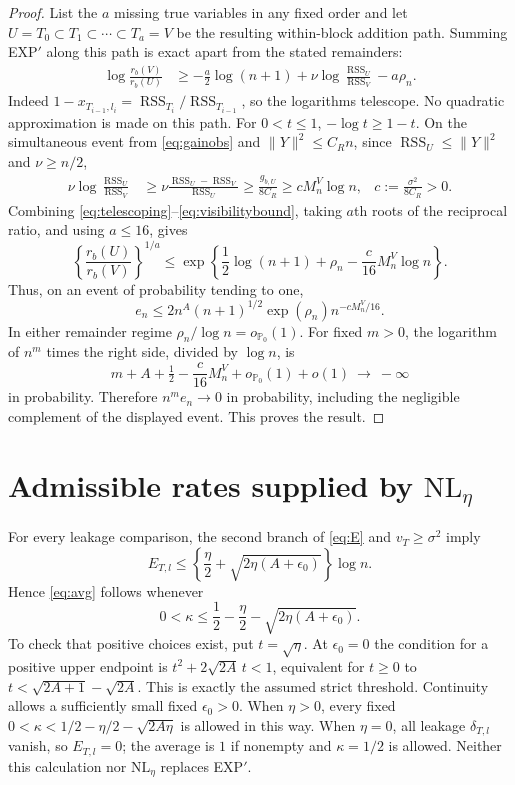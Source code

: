 \documentclass[11pt]{article}
\theoremstyle{remark}\newtheorem{remark}{Remark}
\newcommand{\PP}{\mathbb P_0}
\newcommand{\op}{o_{\PP}}
\newcommand{\RSS}{\operatorname{RSS}}
\begin{document}
\begin{proof}
List the $a$ missing true variables in any fixed order and let
$U=T_0\subset T_1\subset\cdots\subset T_a=V$ be the resulting
within-block addition path. Summing EXP$'$ along this path is exact apart
from the stated remainders:
\begin{align}
 \log\frac{r_b(V)}{r_b(U)}
 &\ge-\frac a2\log(n+1)+\nu\log\frac{\RSS_U}{\RSS_V}-a\rho_n.
 \label{eq:telescoping}
\end{align}
Indeed $1-x_{T_{i-1},l_i}=\RSS_{T_i}/\RSS_{T_{i-1}}$, so the
logarithms telescope. No quadratic approximation is made on this path.
For $0<t\le1$, $-\log t\ge1-t$. On the simultaneous event from
\eqref{eq:gainobs} and $\|Y\|^2\le C_Rn$, since
$\RSS_U\le\|Y\|^2$ and $\nu\ge n/2$,
\begin{align}
 \nu\log\frac{\RSS_U}{\RSS_V}
 &\ge\nu\frac{\RSS_U-\RSS_V}{\RSS_U}
 \ge\frac{g_{b,U}}{8C_R}
 \ge c M_n^V\log n,
 &c:=\frac{\sigma^2}{8C_R}>0.\label{eq:visibilitybound}
\end{align}
Combining \eqref{eq:telescoping}--\eqref{eq:visibilitybound}, taking
$a$th roots of the reciprocal ratio, and using $a\le16$, gives
\[
 \left\{\frac{r_b(U)}{r_b(V)}\right\}^{1/a}
 \le\exp\!\left\{\frac12\log(n+1)+\rho_n
                -\frac{c}{16}M_n^V\log n\right\}.
\]
Thus, on an event of probability tending to one,
\begin{equation}\label{eq:ebound}
 e_n\le 2n^A(n+1)^{1/2}
       \exp(\rho_n)n^{-cM_n^V/16}.
\end{equation}
In either remainder regime $\rho_n/\log n=\op(1)$. For fixed $m>0$,
the logarithm of $n^m$ times the right side, divided by $\log n$, is
\[
 m+A+\tfrac12-\frac c{16}M_n^V+\op(1)+o(1)\ \longrightarrow\ -\infty
\]
in probability. Therefore $n^m e_n\to0$ in probability, including the
negligible complement of the displayed event. This proves the result.
\end{proof}

\section{Admissible rates supplied by \texorpdfstring{$\mathrm{NL}_{\eta}$}{NL-eta}}\label{sec:kappa}

For every leakage comparison, the second branch of \eqref{eq:E} and
$v_T\ge\sigma^2$ imply
\begin{equation}\label{eq:eta}
 E_{T,l}\le
 \left\{\frac\eta2+\sqrt{2\eta(A+\epsilon_0)}\right\}\log n.
\end{equation}
Hence \eqref{eq:avg} follows whenever
\[
 0<\kappa\le\frac12-\frac\eta2-\sqrt{2\eta(A+\epsilon_0)}.
\]
To check that positive choices exist, put $t=\sqrt\eta$. At
$\epsilon_0=0$ the condition for a positive upper endpoint is
$t^2+2\sqrt{2A}\,t<1$, equivalent for $t\ge0$ to
$t<\sqrt{2A+1}-\sqrt{2A}$. This is exactly the assumed strict threshold.
Continuity allows a sufficiently small fixed $\epsilon_0>0$.
When $\eta>0$, every fixed
$0<\kappa<1/2-\eta/2-\sqrt{2A\eta}$ is allowed in this way.
When $\eta=0$, all leakage $\delta_{T,l}$ vanish, so $E_{T,l}=0$;
the average is $1$ if nonempty and $\kappa=1/2$ is allowed.
Neither this calculation nor $\mathrm{NL}_\eta$ replaces EXP$'$.
\end{document}
